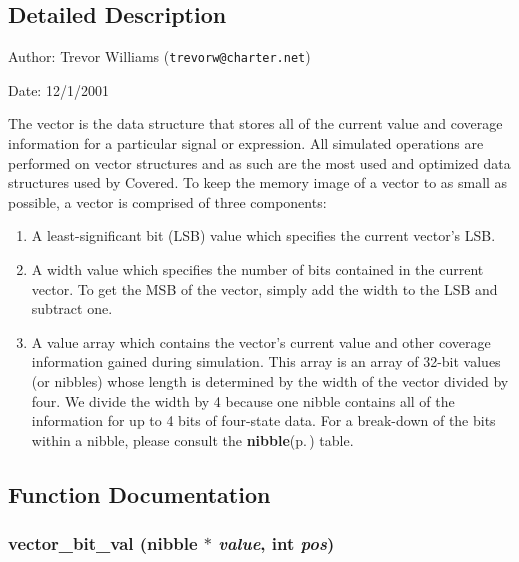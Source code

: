 \subsection{Detailed Description}
\begin{Desc}
\item[Author:]Trevor Williams ({\tt trevorw@charter.net}) \end{Desc}
\begin{Desc}
\item[Date:]12/1/2001\end{Desc}
\begin{Desc}
\item[]The vector is the data structure that stores all of the current value and coverage information for a particular signal or expression. All simulated operations are performed on vector structures and as such are the most used and optimized data structures used by Covered. To keep the memory image of a vector to as small as possible, a vector is comprised of three components:\end{Desc}
\begin{Desc}
\item[]\begin{enumerate}
\item A least-significant bit (LSB) value which specifies the current vector's LSB.\item A width value which specifies the number of bits contained in the current vector. To get the MSB of the vector, simply add the width to the LSB and subtract one.\item A value array which contains the vector's current value and other coverage information gained during simulation. This array is an array of 32-bit values (or nibbles) whose length is determined by the width of the vector divided by four. We divide the width by 4 because one nibble contains all of the information for up to 4 bits of four-state data. For a break-down of the bits within a nibble, please consult the {\bf nibble}{\rm (p.\,\pageref{defines_8h_a154})} table.\end{enumerate}
\end{Desc}


\subsection{Function Documentation}
\subsubsection{ vector\_\-bit\_\-val ({\bf nibble} $\ast$ {\em value}, int {\em pos})}\label{vector_8c_a18}


